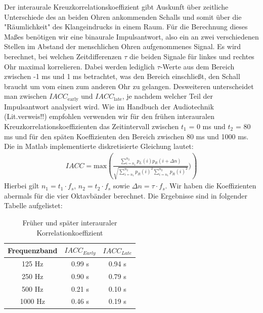 Der interaurale Kreuzkorrelationskoeffizient gibt Auskunft über zeitliche Unterschiede des an beiden Ohren ankommenden Schalls und somit über die "Räumlichkeit" des Klangeindrucks in einem Raum. 
Für die Berechnung dieses Maßes benötigen wir eine binaurale Impulsantwort, also ein an zwei verschiedenen Stellen im Abstand der menschlichen Ohren aufgenommenes Signal. 
Es wird berechnet, bei welchen Zeitdifferenzen $\tau$ die beiden Signale für linkes und rechtes Ohr maximal korrelieren.
Dabei werden lediglich $\tau$-Werte aus dem Bereich zwischen -1 ms und 1 ms betrachtet, was den Bereich einschließt, den Schall braucht um vom einen zum anderen Ohr zu gelangen.  
Desweiteren unterscheidet man zwischen $IACC_{\mathrm{early}}$ und $IACC_{\mathrm{late}}$, je nachdem welcher Teil der Impulsantwort analysiert wird. Wie im Handbuch der Audiotechnik (Lit.verweis!!) empfohlen verwenden wir für den frühen interauralen Kreuzkorrelationskoeffizienten das Zeitintervall zwischen $t_1$ = 0 ms und $t_2$ = 80 ms und für den späten Koeffizienten den Bereich zwischen 80 ms und 1000 ms. 
Die in Matlab implementierte diskretisierte Gleichung lautet:
\begin{align*}
IACC = \mathrm{max}\left( \frac{\sum_{i=n_1}^{n_2} p_L(i)p_R(i+\Delta n)} {\sqrt{\sum_{i=n_1}^{n_2}p_R(i)^2 \sum_{i=n_1}^{n_2} p_R(i)^2 }})\right) 
\end{align*}
Hierbei gilt $n_1 = t_1 \cdot f_s$,  $n_2 = t_2 \cdot f_s$ sowie $\Delta n = \tau \cdot f_s$.
Wir haben die Koeffizienten abermals für die vier Oktavbänder berechnet.
Die Ergebnisse sind in folgender Tabelle aufgelistet:
\begin{table}[H]
    \centering
    \caption{Früher und später interauraler Korrelationkoeffizient}
    \label{tab:iacc}
    \begin{tabular}[\textwidth]{|c|c|c|}
    \hline
        Frequenzband & $IACC_{Early}$ &$IACC_{Late}$ \\
        \hline
        125 Hz & 0.99 s & 0.94 s \\
        250 Hz & 0.90 s & 0.79 s \\
        500 Hz & 0.21 s & 0.10 s \\
        1000 Hz & 0.46 s & 0.19 s \\
        \hline
    \end{tabular}
\end{table}


